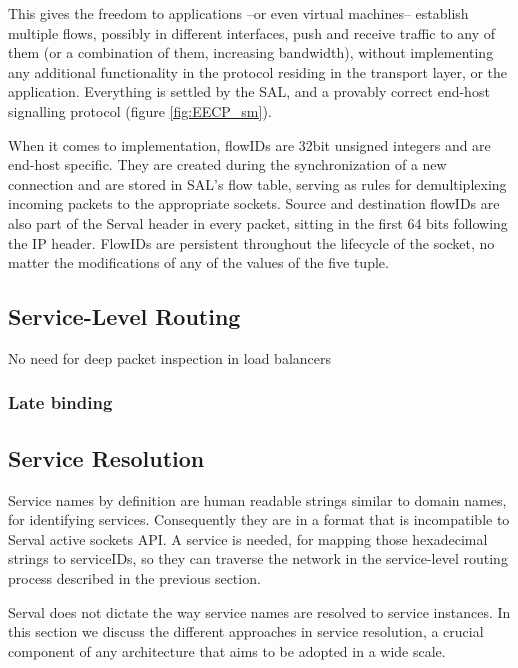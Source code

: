 This gives the freedom to applications --or even virtual machines-- establish multiple flows, possibly in different interfaces, push and receive traffic to any of them (or a combination of them, increasing bandwidth), without implementing any additional functionality in the protocol residing in the transport layer, or the application.
Everything is settled by the SAL, and a provably correct end-host signalling protocol (figure \ref{fig:EECP_sm}).

When it comes to implementation, flowIDs are 32bit unsigned integers and are end-host specific.
They are created during the synchronization of a new connection and are stored in SAL's flow table, serving as rules for demultiplexing incoming packets to the appropriate sockets.
Source and destination flowIDs are also part of the Serval header in every packet, sitting in the first 64 bits following the IP header.
FlowIDs are persistent throughout the lifecycle of the socket, no matter the modifications of any of the values of the five tuple.



\subsection{Service-Level Routing} 
No need for deep packet inspection in load balancers



\subsubsection{Late binding}



\subsection{Service Resolution}
Service names by definition are human readable strings similar to domain names, for identifying services.
Consequently they are in a format that is incompatible to Serval active sockets API.
A service is needed, for mapping those hexadecimal strings to serviceIDs, so they can traverse the network in the service-level routing process described in the previous section.

Serval does not dictate the way service names are resolved to service instances.
In this section we discuss the different approaches in service resolution, a crucial component of any architecture that aims to be adopted in a wide scale.

